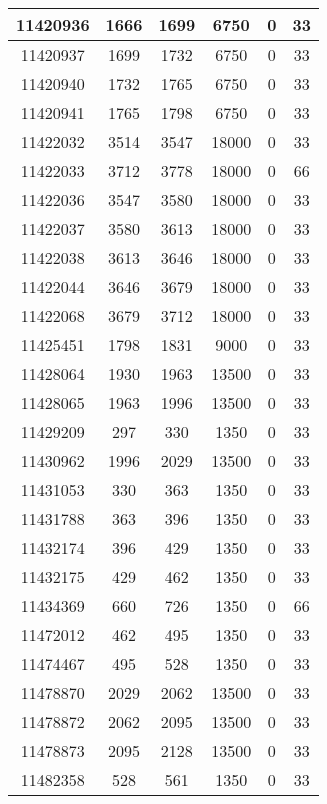 \begin{appendices}
\begin{center}
\begin{longtable}{|c|c|c|c|c|c|}
11420936 & 1666  & 1699  & 6750  & 0     & 33  \\ \hline
11420937 & 1699  & 1732  & 6750  & 0     & 33  \\ \hline
11420940 & 1732  & 1765  & 6750  & 0     & 33  \\ \hline
11420941 & 1765  & 1798  & 6750  & 0     & 33  \\ \hline
11422032 & 3514  & 3547  & 18000 & 0     & 33  \\ \hline
11422033 & 3712  & 3778  & 18000 & 0     & 66  \\ \hline
11422036 & 3547  & 3580  & 18000 & 0     & 33  \\ \hline
11422037 & 3580  & 3613  & 18000 & 0     & 33  \\ \hline
11422038 & 3613  & 3646  & 18000 & 0     & 33  \\ \hline
11422044 & 3646  & 3679  & 18000 & 0     & 33  \\ \hline
11422068 & 3679  & 3712  & 18000 & 0     & 33  \\ \hline
11425451 & 1798  & 1831  & 9000  & 0     & 33  \\ \hline
11428064 & 1930  & 1963  & 13500 & 0     & 33  \\ \hline
11428065 & 1963  & 1996  & 13500 & 0     & 33  \\ \hline
11429209 & 297   & 330   & 1350  & 0     & 33  \\ \hline
11430962 & 1996  & 2029  & 13500 & 0     & 33  \\ \hline
11431053 & 330   & 363   & 1350  & 0     & 33  \\ \hline
11431788 & 363   & 396   & 1350  & 0     & 33  \\ \hline
11432174 & 396   & 429   & 1350  & 0     & 33  \\ \hline
11432175 & 429   & 462   & 1350  & 0     & 33  \\ \hline
11434369 & 660   & 726   & 1350  & 0     & 66  \\ \hline
11472012 & 462   & 495   & 1350  & 0     & 33  \\ \hline
11474467 & 495   & 528   & 1350  & 0     & 33  \\ \hline
11478870 & 2029  & 2062  & 13500 & 0     & 33  \\ \hline
11478872 & 2062  & 2095  & 13500 & 0     & 33  \\ \hline
11478873 & 2095  & 2128  & 13500 & 0     & 33  \\ \hline
11482358 & 528   & 561   & 1350  & 0     & 33  \\ \hline

\end{longtable}
\end{center}
\end{appendices}
